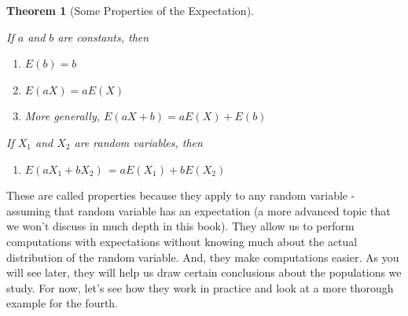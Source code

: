 \documentclass[
]{book}
\providecommand{\tightlist}{%
  \setlength{\itemsep}{0pt}\setlength{\parskip}{0pt}}
\newtheorem{theorem}{Theorem}[chapter]
\theoremstyle{definition}
\theoremstyle{definition}
\theoremstyle{definition}
\theoremstyle{definition}
\theoremstyle{remark}
\begin{document}
\begin{theorem}[Some Properties of the Expectation]
\protect\hypertarget{thm:expprop}{}\label{thm:expprop}

If \(a\) and \(b\) are constants, then

\begin{enumerate}
\def\labelenumi{\arabic{enumi}.}
\item
  \(E(b) = b\)
\item
  \(E(aX) = aE(X)\)
\item
  More generally, \(E(aX + b) = aE(X) + E(b)\)
\end{enumerate}

If \(X_1\) and \(X_2\) are random variables, then

\begin{enumerate}
\def\labelenumi{\arabic{enumi}.}
\setcounter{enumi}{3}
\tightlist
\item
  \(E(aX_1 + bX_2)\) = \(aE(X_1) + bE(X_2)\)
\end{enumerate}

\end{theorem}

These are called properties because they apply to any random variable - assuming that random variable has an expectation (a more advanced topic that we won't discuss in much depth in this book). They allow us to perform computations with expectations without knowing much about the actual distribution of the random variable. And, they make computations easier. As you will see later, they will help us draw certain conclusions about the populations we study. For now, let's see how they work in practice and look at a more thorough example for the fourth.
\end{document}
